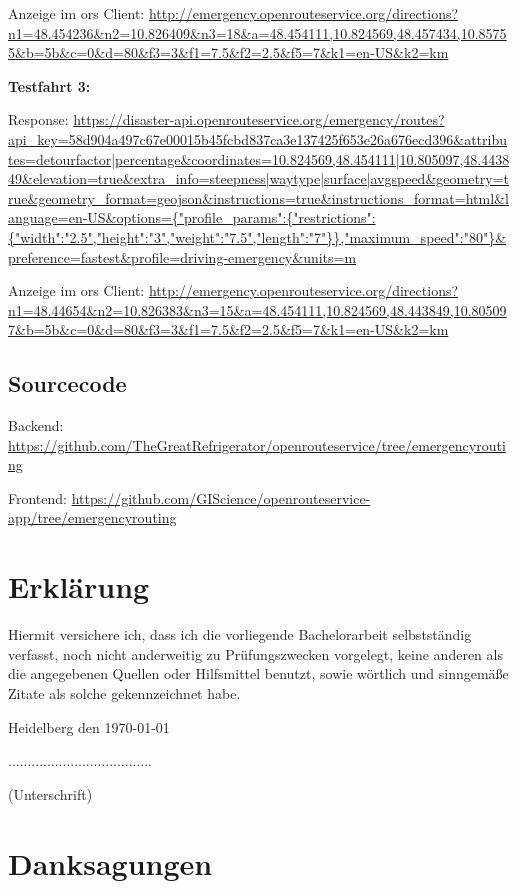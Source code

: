 Anzeige im \gls{ors} Client:
\url{http://emergency.openrouteservice.org/directions?n1=48.454236&n2=10.826409&n3=18&a=48.454111,10.824569,48.457434,10.85755&b=5b&c=0&d=80&f3=3&f1=7.5&f2=2.5&f5=7&k1=en-US&k2=km}

\textbf{Testfahrt 3:}

Response:
\url{https://disaster-api.openrouteservice.org/emergency/routes?api_key=58d904a497c67e00015b45fcbd837ca3e137425f653e26a676ecd396&attributes=detourfactor|percentage&coordinates=10.824569,48.454111|10.805097,48.443849&elevation=true&extra_info=steepness|waytype|surface|avgspeed&geometry=true&geometry_format=geojson&instructions=true&instructions_format=html&language=en-US&options={"profile_params":{"restrictions":{"width":"2.5","height":"3","weight":"7.5","length":"7"}},"maximum_speed":"80"}&preference=fastest&profile=driving-emergency&units=m}

Anzeige im \gls{ors} Client:
\url{http://emergency.openrouteservice.org/directions?n1=48.44654&n2=10.826383&n3=15&a=48.454111,10.824569,48.443849,10.805097&b=5b&c=0&d=80&f3=3&f1=7.5&f2=2.5&f5=7&k1=en-US&k2=km}

\subsection*{Sourcecode}

Backend:
\url{https://github.com/TheGreatRefrigerator/openrouteservice/tree/emergencyrouting}


Frontend:
\url{https://github.com/GIScience/openrouteservice-app/tree/emergencyrouting}

\newpage
\section*{Erklärung}
\vspace{1cm}
Hiermit versichere ich, dass ich die vorliegende Bachelorarbeit selbstständig verfasst, noch nicht anderweitig zu Prüfungszwecken vorgelegt, keine anderen als die angegebenen Quellen oder Hilfsmittel benutzt, sowie wörtlich und sinngemäße Zitate als solche gekennzeichnet habe.\par
\bigskip

{\flushleft Heidelberg den \today } {\hfill .....................................\par}
{\hfill (Unterschrift)}

\newpage
\section*{Danksagungen}

